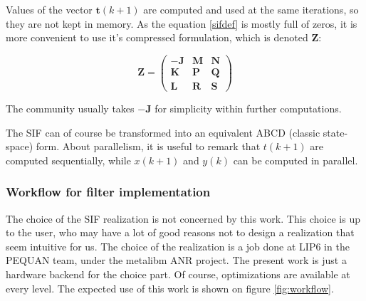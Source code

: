 
	Values of the vector $\boldsymbol{t}(k+1)$ are computed and used at the same iterations, so they are not kept in memory.
	As the equation \ref{sifdef} is mostly full of zeros, it is more convenient to use it’s compressed formulation, which is denoted
	$\boldsymbol{Z}$:
	
	\begin{equation} \label{zmatrix}
		\boldsymbol{Z}=
		\begin{pmatrix}
			\boldsymbol{-J} & \boldsymbol{M} & \boldsymbol{N} \\
			\boldsymbol{K} & \boldsymbol{P} & \boldsymbol{Q} \\
			\boldsymbol{L} & \boldsymbol{R} & \boldsymbol{S} 
		\end{pmatrix}
	\end{equation}

	The community usually takes $-\boldsymbol{J}$ for simplicity within further computations.

	The SIF can of course be transformed into an equivalent ABCD (classic state-space) form.
	About parallelism, it is useful to remark that $t(k+1)$ are computed sequentially, while $x(k+1)$ and $y(k)$ can be computed in parallel.
%
%

	\subsubsection{Workflow for filter implementation}
		The choice of the SIF realization is not concerned by this work.
		This choice is up to the user, who may have a lot of good reasons not to design a realization that seem intuitive for us.
		The choice of the realization is a job done at LIP6 in the PEQUAN team, under the metalibm ANR project.
		The present work is just a hardware backend for the choice part.
		Of course, optimizations are available at every level.
		The expected use of this work is shown on figure \ref{fig:workflow}.


